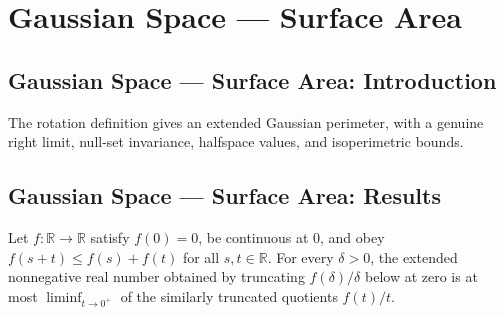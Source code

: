 \section{Gaussian Space --- Surface Area}
\subsection*{Gaussian Space --- Surface Area: Introduction}
The rotation definition gives an extended Gaussian perimeter, with a genuine right limit, null-set invariance, halfspace values, and isoperimetric bounds.

\subsection*{Gaussian Space --- Surface Area: Results}

\begin{lemma}
\leanok
{}
Let $f\colon\mathbb R\to\mathbb R$ satisfy $f(0)=0$, be continuous at $0$, and obey
$f(s+t)\le f(s)+f(t)$ for all $s,t\in\mathbb R$. For every $\delta>0$, the extended
nonnegative real number obtained by truncating $f(\delta)/\delta$ below at zero is at
most $\liminf_{t\to0^+}$ of the similarly truncated quotients $f(t)/t$.
\end{lemma}

